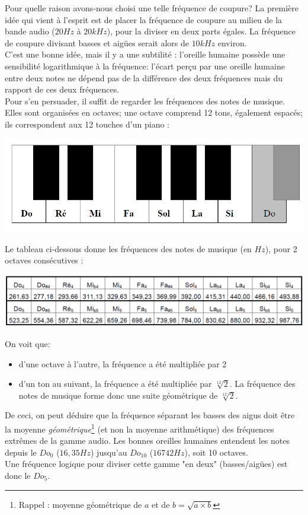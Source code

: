 Pour quelle raison avons-nous choisi une telle fréquence de coupure? La première idée qui vient à l'esprit est de placer la fréquence de coupure au milieu de la bande audio ($20Hz$ à $20kHz$), pour la diviser en deux parts égales. La fréquence de coupure divisant basses et aigües serait alors de $10kHz$ environ.\\
C'est une bonne idée, mais il y a une subtilité : l'oreille humaine possède une sensibilité logarithmique à la fréquence: l'écart perçu par une oreille humaine entre deux notes ne dépend pas de la différence des deux fréquences mais du rapport de ces deux fréquences.\\
Pour s'en persuader, il suffit de regarder les fréquences des notes de musique. Elles sont organisées en octaves; une octave comprend 12 tons, également espacés; ils correspondent aux 12 touches d'un piano :
\begin{center}
\includegraphics[scale=0.4]{piano.PNG}
\label{piano}
\end{center}

Le tableau ci-dessous donne les fréquences des notes de musique (en $Hz$), pour 2 octaves consécutives :
\begin{center}
\includegraphics[scale=0.4]{notes.PNG}
\label{notes}
\end{center}

On voit que:
\begin{itemize}
\item d'une octave à l'autre, la fréquence a été multipliée par 2
\item d'un ton au suivant, la fréquence a été multipliée par $\sqrt[12]{2}$. La fréquence des notes de musique forme donc une suite géométrique de $\sqrt[12]{2}$.
\end{itemize}

De ceci, on peut déduire que la fréquence séparant les basses des aigus doit être la moyenne \emph{géométrique}\footnote{Rappel : moyenne géométrique de $a$ et de $b = \sqrt{a\times b}$} (et non la moyenne arithmétique) des fréquences extrêmes de la gamme audio. Les bonnes oreilles humaines entendent les notes depuis le $Do_0$ ($16,35Hz$) jusqu'au $Do_{10}$ ($16742Hz$), soit 10 octaves.\\
Une fréquence logique pour diviser cette gamme "en deux" (basses/aigües) est donc le $Do_5$.\\


